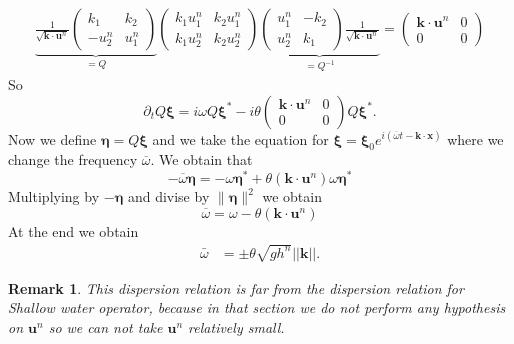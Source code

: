 \documentclass[a4paper, 11pt]{report}
\newtheorem{Remark}{Remark}
\begin{document}
\begin{equation*}
\begin{split}
\underbrace{\frac{1}{\sqrt{\boldsymbol{k}\cdot \boldsymbol{u}^n}}
\begin{pmatrix}
k_1&k_2\\-u_2^n&u_1^n
\end{pmatrix}}_{=Q}\begin{pmatrix}k_1u_1^n&k_2u_1^n\\k_1u_2^n&k_2u_2^n\end{pmatrix}\underbrace{\begin{pmatrix}u_1^n&-k_2\\u_2^n&k_1\end{pmatrix}\frac{1}{\sqrt{\boldsymbol{k}\cdot \boldsymbol{u}^n}}}_{=Q^{-1}}=\begin{pmatrix}\boldsymbol{k}\cdot \boldsymbol{u}^n&0\\0&0\end{pmatrix}
\end{split}
\end{equation*}
So \begin{equation*}
\partial_t Q\boldsymbol{\xi}=i\omega Q\boldsymbol{\xi}^*-i\theta\begin{pmatrix}\boldsymbol{k}\cdot \boldsymbol{u}^n&0\\0&0\end{pmatrix}Q\boldsymbol{\xi}^*.
\end{equation*}
Now we define $\boldsymbol{\eta}=Q\boldsymbol{\xi}$  and we take the equation for $\boldsymbol{\xi}=\boldsymbol{\xi}_0e^{i(\overline{\omega} t-\boldsymbol{k}\cdot \boldsymbol{x})}$ where we change the frequency $\overline{\omega}$. We obtain that
\begin{equation*}
- \overline{\omega} \boldsymbol{\eta}=- \omega\boldsymbol{\eta}^*+\theta(\boldsymbol{k}\cdot \boldsymbol{u}^n) \omega \boldsymbol{\eta}^*\end{equation*}
Multiplying by  $-\boldsymbol{\eta}$ and divise by  $\parallel\boldsymbol{\eta}\parallel^2$ we obtain
$$
\overline{\omega}=\omega -\theta(\boldsymbol{k}\cdot \boldsymbol{u}^n)
$$
At the end we obtain
\begin{align*}
\bar{\omega} &=\pm\theta\sqrt{gh^n}||\boldsymbol{k}||.
\end{align*}

\begin{Remark}
This dispersion relation is far from the dispersion relation for Shallow water operator, because in that section we do not perform any hypothesis on $\boldsymbol{u}^n$ so we can not take $\boldsymbol{u}^n$ relatively small.
\end{Remark}
\end{document}

